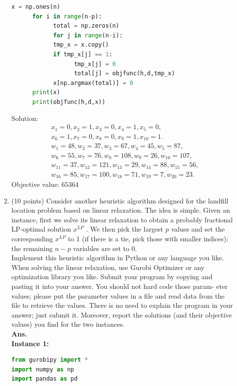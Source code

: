 \documentclass[12pt]{article}
\begin{document}
\begin{enumerate}
\begin{enumerate}
\begin{lstlisting}[language=Python]
      x = np.ones(n)
      for i in range(n-p):
            total = np.zeros(n)
            for j in range(n-i):
            tmp_x = x.copy()
            if tmp_x[j] == 1:
                  tmp_x[j] = 0
                  total[j] = objfunc(h,d,tmp_x)
            x[np.argmax(total)] = 0
      print(x)
      print(objfunc(h,d,x))    
                  \end{lstlisting}
                        Solution:
                        \begin{align*}
                               & x_1 = 0, x_2 = 1, x_3 = 0, x_4 = 1, x_5 = 0,                      \\
                               & x_6 = 1, x_7 = 0, x_8 = 0, x_9 = 1, x_{10} = 1.                   \\
                               & w_1 = 48, w_2 = 37, w_3 = 67, w_4 = 45, w_5 = 87,                 \\
                               & w_6 = 55, w_7 = 76, w_8 = 108, w_9 = 26, w_{10} = 107,            \\
                               & w_{11} = 37, w_{12} = 121, w_{13} = 29, w_{14} = 88, w_{15} = 56, \\
                               & w_{16} = 85, w_{17} = 100, w_{18} = 71, w_{19} = 7, w_{20} = 23.
                        \end{align*}
                        Objective value:  $65364$
                  \item (10 points) Consider another heuristic algorithm designed for the landfill location problem
                        based on linear relaxation. The idea is simple. Given an instance, first we solve its linear
                        relaxation to obtain a probably fractional LP-optimal solution $x^{LP}$ . We then pick the largest
                        $p$ values and set the corresponding $x^{LP}$ to 1 (if there is a tie, pick those with smaller indices);
                        the remaining $n - p$ variables are set to 0.\\
                        Implement this heuristic algorithm in Python or any language you like. When solving the linear relaxation, use Gurobi Optimizer or any optimization library you like. Submit your program by copying and pasting it into your answer. You should not hard code those param- eter values; please put the parameter values in a file and read data from the file to retrieve the values. There is no need to explain the program in your answer; just submit it. Moreover, report the solutions (and their objective values) you find for the two instances.\\
                        \textbf{Ans.}\\
                        \textbf{Instance 1:}
                        \begin{lstlisting}[language=Python]
from gurobipy import *
import numpy as np
import pandas as pd


\end{lstlisting}
\end{enumerate}
\end{enumerate}
\end{document}
